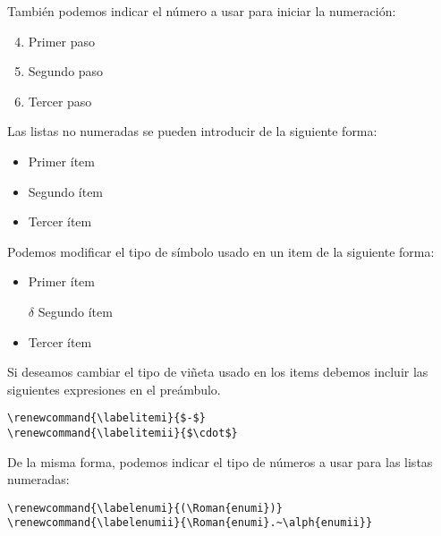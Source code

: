 \documentclass[letterpaper,11pt]{article}
\begin{document}
También podemos indicar el número a usar para iniciar la numeración:

\begin{enumerate}
	\setcounter{enumi}{3}
	\item Primer paso
	\item Segundo paso
	\item Tercer paso
\end{enumerate}


Las listas no numeradas se pueden introducir de la siguiente forma: 

\begin{itemize}
	\item Primer ítem
	\item Segundo ítem
	\item Tercer ítem
\end{itemize}

Podemos modificar el tipo de símbolo usado en un item de la siguiente forma:

\begin{itemize}
	\item Primer ítem
	\item[$\delta$] Segundo ítem
	\item Tercer ítem
\end{itemize}

Si deseamos cambiar el tipo de viñeta usado en los items debemos incluir las siguientes expresiones en el preámbulo.

\begin{verbatim}
\renewcommand{\labelitemi}{$-$}
\renewcommand{\labelitemii}{$\cdot$}
\end{verbatim}

De la misma forma, podemos indicar el tipo de números a usar para las listas numeradas:

\begin{verbatim}
\renewcommand{\labelenumi}{(\Roman{enumi})}
\renewcommand{\labelenumii}{\Roman{enumi}.~\alph{enumii}}
\end{verbatim}

\end{document}
